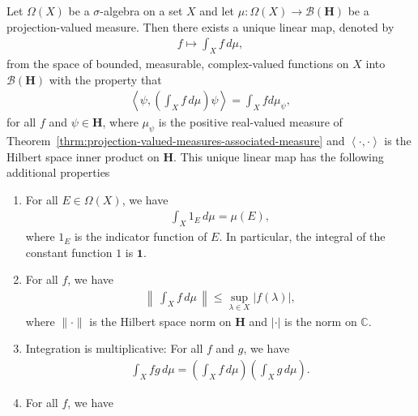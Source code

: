 \begin{theorem}
    \label{thrm:operator-valued-integration} %
    Let $\Omega(X)$ be a $\sigma$-algebra on a set $X$ and let $\mu : \Omega(X) \rightarrow \mathcal{B}(\mathbf{H})$ be a projection-valued measure. Then there exists a unique linear map, denoted by
    \begin{align}
        f \longmapsto \int_X f \, d\mu,
    \end{align}
    from the space of bounded, measurable, complex-valued functions on $X$ into $\mathcal{B}(\mathbf{H})$ with the property that
    \begin{align}
        \left< \psi, \left( \int_X f \, d\mu \right) \psi \right> = \int_X f d\mu_\psi,
    \end{align}
    for all $f$ and $\psi \in \mathbf{H}$, where $\mu_\psi$ is the positive real-valued measure of Theorem~\ref{thrm:projection-valued-measures-associated-measure} and $\left< \cdot, \cdot \right>$ is the Hilbert space inner product on $\mathbf{H}$. This unique linear map has the following additional properties
    \begin{enumerate}
        \item For all $E \in \Omega(X)$, we have
            \begin{align}
                \int_X 1_E \, d\mu = \mu(E),
            \end{align}
            where $1_E$ is the indicator function of $E$. In particular, the integral of the constant function $1$ is $\mathbf{1}$.
        \item For all $f$, we have
            \begin{align}
                \left\| \, \int_X f \, d\mu \, \right\| \le \sup\limits_{\lambda \in X} \left| f(\lambda) \right|,
            \end{align}
            where $\|\cdot\|$ is the Hilbert space norm on $\mathbf{H}$ and $|\cdot|$ is the norm on $\mathbb{C}$.
        \item Integration is multiplicative: For all $f$ and $g$, we have
            \begin{align}
                \int_X fg \, d\mu = \left( \int_X f \, d\mu \right) \left( \int_X g \, d\mu \right).
            \end{align}
        \item For all $f$, we have

\end{enumerate}
\end{theorem}
